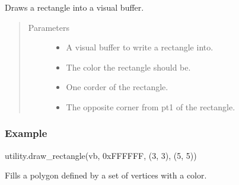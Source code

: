 \documentclass[letterpaper,10pt,english,openany,oneside]{sphinxmanual}
\begin{document}
\begin{fulllineitems}

\pysigstartsignatures
{}
\pysigstopsignatures
\sphinxAtStartPar
Draws a rectangle into a visual buffer.
\begin{quote}\begin{description}
\item[{Parameters}] \leavevmode\begin{itemize}
\item {} 
\sphinxAtStartPar
{} \textendash{} A visual buffer to write a rectangle into.

\item {} 
\sphinxAtStartPar
{} \textendash{} The color the rectangle should be.

\item {} 
\sphinxAtStartPar
{} \textendash{} One corder of the rectangle.

\item {} 
\sphinxAtStartPar
{} \textendash{} The opposite corner from pt1 of the rectangle.

\end{itemize}

\end{description}\end{quote}
\subsubsection*{Example}

\sphinxAtStartPar
utility.draw\_rectangle(vb, 0xFFFFFF, (3, 3), (5, 5))

\end{fulllineitems}



\begin{fulllineitems}

\pysigstartsignatures
{}
\pysigstopsignatures
\sphinxAtStartPar
Fills a polygon defined by a set of vertices with a color.

\end{fulllineitems}
\end{document}
